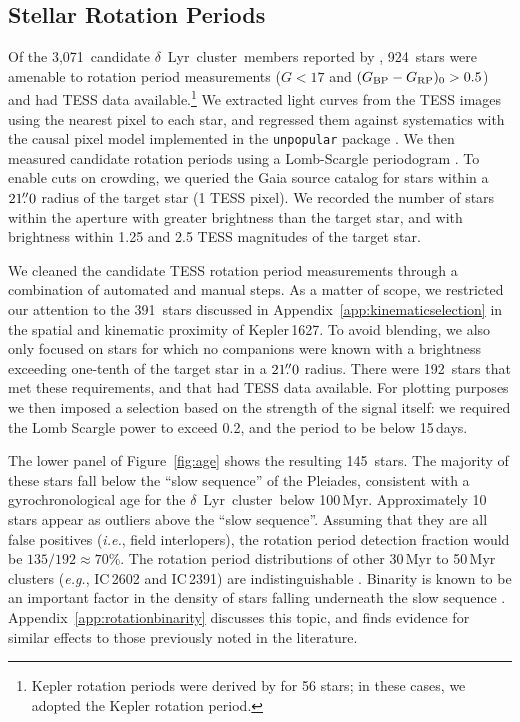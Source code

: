 \documentclass[12pt,modern,twocolumn,tighten]{aastex63}
\newcommand{\cn}{$\delta$\ Lyr\ cluster} %
\newcommand{\noriginal}{3{,}071} %
\newcommand{\nwithtess}{924} %
\newcommand{\nkinwithtess}{391} %
\newcommand{\nkinwithtessandcrowding}{192} %
\newcommand{\nkindefaultcleaning}{145} %
\newcommand{\nrotgood}{135} %
\newcommand{\nfracprot}{70} %
\newcommand{\bpmrpo}{(G_{\rm BP}-G_{\rm RP})_0}
\begin{document}
\subsection{Stellar Rotation Periods}

Of the \noriginal\ candidate \cn\ members reported by
\citet{kounkel_untangling_2019}, \nwithtess\ stars were amenable to
rotation period measurements ($G<17$ and $\bpmrpo>0.5$) and had TESS
data available.\footnote{Kepler rotation periods were derived by
\citet{mcquillan_rotation_2014} for 56 stars; in these cases, we
adopted the Kepler rotation period.  } We extracted light curves from
the TESS images using the nearest pixel to each star, and regressed
them against systematics with the causal pixel model implemented in
the \texttt{unpopular} package \citep{hattorio_2021_cpm}.  We then
measured candidate rotation periods using a Lomb-Scargle periodogram
\citep{lomb_1976,scargle_studies_1982,astropy_2018}.  To enable cuts
on crowding, we queried the Gaia source catalog for stars within a
$21\mbox{$.\!\!^{\prime\prime}$}0$ radius of the target star (1 TESS pixel).  We recorded the
number of stars within the aperture with greater brightness than the
target star, and with brightness within 1.25 and 2.5 TESS magnitudes
of the target star.  

We cleaned the candidate TESS rotation period measurements through a
combination of automated and manual steps.  As a matter of scope, we
restricted our attention to the \nkinwithtess\ stars discussed in
Appendix~\ref{app:kinematicselection} in the spatial and kinematic
proximity of Kepler\,1627.  To avoid blending, we also only focused on
stars for which no companions were known with a brightness exceeding
one-tenth of the target star in a $21\mbox{$.\!\!^{\prime\prime}$}0$ radius.  There were
\nkinwithtessandcrowding\ stars that met these requirements, and that
had TESS data available.  For plotting purposes we then imposed a
selection based on the strength of the signal itself: we required the
Lomb Scargle power to exceed 0.2, and the period to be below 15\,days.

The lower panel of Figure~\ref{fig:age} shows the resulting
\nkindefaultcleaning\ stars.  The majority of these stars fall below
the ``slow sequence'' of the Pleiades, consistent with a
gyrochronological age for the \cn\ below 100\,Myr.  Approximately 10
stars appear as outliers above the ``slow sequence''.  Assuming that
they are all false positives ({\it i.e.}, field interlopers), the
rotation period detection fraction would be
$\nrotgood/\nkinwithtessandcrowding \approx \nfracprot\%$.  The
rotation period distributions of other 30\,Myr to 50\,Myr clusters
({\it e.g.}, IC\,2602 and IC\,2391) are indistinguishable
\citep{douglas_stephanie_t_2021_5131306}.  Binarity is known to be an
important factor in the density of stars falling underneath the slow
sequence
\citep{meibom_effect_2007,gillen_ngts_2020,bouma_2021_ngc2516}.
Appendix~\ref{app:rotationbinarity} discusses this topic, and finds
evidence for similar effects to those previously noted in the
literature.
\end{document}
